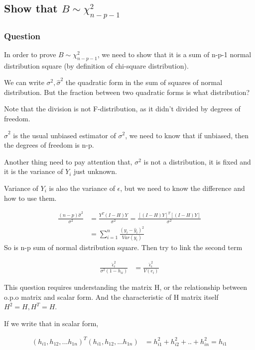 \documentclass[11pt]{article} %
\begin{document}
\subsection{Show that $B \sim \chi^2_{n-p-1}$}

\subsubsection{Question}
In order to prove $B \sim \chi^2_{n-p-1}$, we need to show that it is a sum of n-p-1 normal distribution square (by definition of chi-square distribution). 

We can write $\sigma^2, \hat{\sigma}^2$ the quadratic form in the sum of squares of normal distribution. But the fraction between two quadratic forms is what distribution? 

Note that the division is not F-distribution, as it didn't divided by degrees of freedom. 

$\hat{\sigma}^2$ is the usual unbiased estimator of $\sigma^2$, we need to know that if unbiased, then the degrees of freedom is n-p.

Another thing need to pay attention that,  $\sigma^2$ is not a distribution, it is fixed and it is the variance of $Y_i$ just unknown. 

Variance of $Y_i$ is also the variance of $\epsilon$, but we need to know the difference and how to use them.

\begin{align*}
	\frac{(n-p)\hat{\sigma}^2 }{\sigma^2} &= \frac{Y^T (I-H) Y}{\sigma^2} = \frac{[(I-H)Y]^T [(I-H)Y]}{\sigma^2} \\
	&= \sum_{i=1}^n  \frac{(y_i-\hat{y}_i)^2}{Var(y_i)}
\end{align*}
So  is n-p sum of normal distribution square. Then try to link the second term

\begin{align*}
	\frac{\hat{\epsilon}_i^2}{\sigma^2(1-h_{ii})}&= \frac{\hat{\epsilon}_i^2}{V(e_i)} 
\end{align*}

This question requires understanding the matrix H, or the relationship between o.p.o matrix and scalar form. And the characteristic of H matrix itself $H^2 = H, H^T = H$. 

If we write that in scalar form, 

\begin{align*}
	(h_{i1}, h_{12}, ... h_{1n})^T (h_{i1}, h_{12}, ... h_{1n}) &= h_{i1}^2 + h_{i2}^2 + .. + h_{in}^2 = h_{i1}
\end{align*} 
\end{document}
